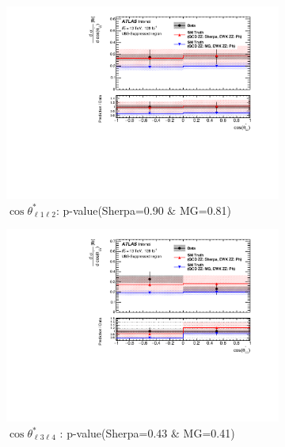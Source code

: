 \begin{figure}[!htb]
    \centering
    \begin{subfigure}{.49\textwidth}
        \centering
        \includegraphics[width=.98\linewidth]{figures/Results/CrossSection_VBSSuppressed/xs_cosThetaStar1_CR.pdf}
        \caption{ \footnotesize{$\cos \theta^{*}_{\ell 1 \ell 2}$}: p-value(Sherpa=0.90 $\&$ MG=0.81)}
    \end{subfigure}
    \begin{subfigure}{.49\textwidth}
        \centering
        \includegraphics[width=.98\linewidth]{figures/Results/CrossSection_VBSSuppressed/xs_cosThetaStar3_CR.pdf}
        \caption{ \footnotesize{$\cos \theta^{*}_{\ell 3 \ell 4}$ }: p-value(Sherpa=0.43 $\&$ MG=0.41)}
    \end{subfigure}\\
    \begin{subfigure}{.49\textwidth}

\end{subfigure}
\end{figure}
